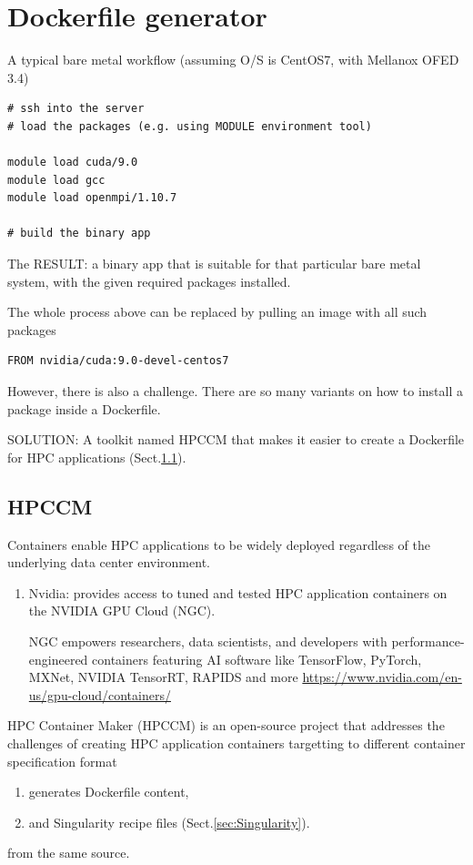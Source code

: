 \section{Dockerfile generator}


A typical bare metal workflow (assuming O/S is CentOS7, with Mellanox OFED 3.4)
\begin{verbatim}
# ssh into the server
# load the packages (e.g. using MODULE environment tool)

module load cuda/9.0
module load gcc
module load openmpi/1.10.7

# build the binary app

\end{verbatim}

The RESULT: a binary app that is suitable for that particular bare metal system, with the given required packages installed.

The whole process above can be replaced by pulling an image with all such packages
\begin{verbatim}
FROM nvidia/cuda:9.0-devel-centos7
\end{verbatim}

However, there is also a challenge. There are so many variants on how to install
a package inside a Dockerfile.


SOLUTION: A toolkit named HPCCM  that makes it easier to create a Dockerfile for
HPC applications (Sect.\ref{sec:HPCCM}).


\subsection{HPCCM}
\label{sec:HPCCM}

Containers enable HPC applications to be widely deployed regardless of the
underlying data center environment. 

\begin{enumerate}

  \item Nvidia: provides access to tuned and tested HPC application containers on the NVIDIA GPU Cloud (NGC).
  
  NGC empowers researchers, data scientists, and developers with
  performance-engineered containers featuring AI software like TensorFlow,
  PyTorch, MXNet, NVIDIA TensorRT, RAPIDS and more
  \url{https://www.nvidia.com/en-us/gpu-cloud/containers/}
  
\end{enumerate}

HPC Container Maker (HPCCM) is an open-source project that addresses the
challenges of creating HPC application containers targetting to different container specification format
\begin{enumerate}
  
  \item generates Dockerfile content, 

  \item and Singularity recipe files (Sect.\ref{sec:Singularity}).
\end{enumerate}
from the same source.

